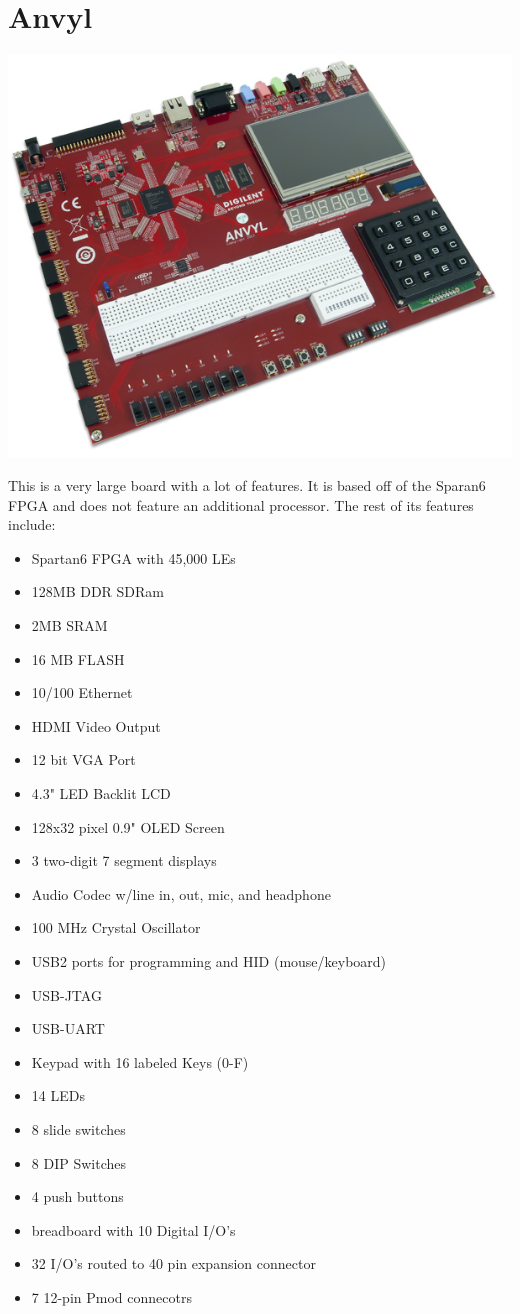 \documentclass{article}
\begin{document}
	\newpage
	\section{Anvyl}
	\includegraphics[scale=0.5]{ANVYL}
        
	This is a very large board with a lot of features. It is based off of the Sparan6 FPGA and does not feature
	an additional processor. The rest of its features include:

	\begin{itemize}
	\item Spartan6 FPGA with 45,000 LEs
	\item 128MB DDR SDRam 
	\item 2MB SRAM
	\item 16 MB FLASH
	\item 10/100 Ethernet
	\item HDMI Video Output
	\item 12 bit VGA Port
	\item 4.3" LED Backlit LCD
	\item 128x32 pixel 0.9" OLED Screen
	\item 3 two-digit 7 segment displays
	\item Audio Codec w/line in, out, mic, and headphone
	\item 100 MHz Crystal Oscillator
	\item USB2 ports for programming and HID (mouse/keyboard)
	\item USB-JTAG
	\item USB-UART
	\item Keypad with 16 labeled Keys (0-F)
	\item 14 LEDs
	\item 8 slide switches
	\item 8 DIP Switches
	\item 4 push buttons
	\item breadboard with 10 Digital I/O's
	\item 32 I/O's routed to 40 pin expansion connector
	\item 7 12-pin Pmod connecotrs
	\end{itemize}
\end{document}
